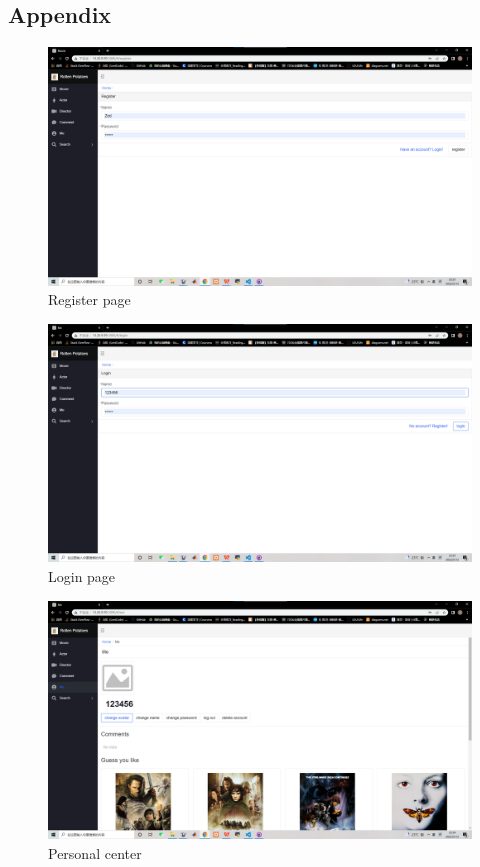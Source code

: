 \begin{CJK*}{UTF8}{gbsn}
\section{Appendix}
\begin{figure}[htbp]
    \centering
    \includegraphics[width=1\textwidth]{reg.png}
    \caption{Register page}
    \end{figure}
    
    \begin{figure}[htbp]
    \centering
    \includegraphics[width=1\textwidth]{res_login.png}
    \caption{Login page}
    \end{figure}
    
    \begin{figure}[htbp]
    \centering
    \includegraphics[width=1\textwidth]{res_ps.png}
    \caption{Personal center}
    \end{figure}
    

\end{CJK*}
